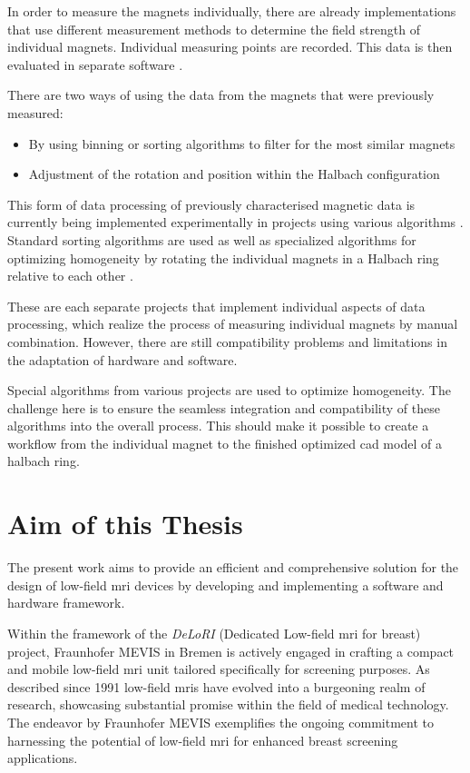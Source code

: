 In order to measure the magnets individually, there are already
implementations that use different measurement methods to determine the
field strength of individual magnets. Individual measuring points are
recorded. This data is then evaluated in separate software
\cite{Wickenbrock_2021}.

There are two ways of using the data from the magnets that were
previously measured:

\begin{itemize}
\tightlist
\item
  By using binning or sorting algorithms to filter for the most similar
  magnets
\item
  Adjustment of the rotation and position within the Halbach
  configuration
\end{itemize}

This form of data processing of previously characterised magnetic data
is currently being implemented experimentally in projects using various
algorithms \cite{Wickenbrock_2021}. Standard sorting algorithms are
used as well as specialized algorithms for optimizing homogeneity by
rotating the individual magnets in a Halbach ring relative to each other
\cite{HalbachMRIDesigner}.

These are each separate projects that implement individual aspects of
data processing, which realize the process of measuring individual
magnets by manual combination. However, there are still compatibility
problems and limitations in the adaptation of hardware and software.

Special algorithms from various projects are used to optimize
homogeneity. The challenge here is to ensure the seamless integration
and compatibility of these algorithms into the overall process. This
should make it possible to create a workflow from the individual magnet
to the finished optimized \gls{cad} model of a halbach ring.

\hypertarget{aim-of-this-thesis}{%
\section{Aim of this Thesis}\label{aim-of-this-thesis}}

The present work aims to provide an efficient and comprehensive solution
for the design of low-field \gls{mri} devices by developing and
implementing a software and hardware framework.

Within the framework of the \emph{DeLoRI} (Dedicated Low-field \gls{mri}
for breast) project, Fraunhofer MEVIS in Bremen is actively engaged in
crafting a compact and mobile low-field \gls{mri} unit tailored
specifically for screening purposes. As described since 1991 low-field
\gls{mri}s have evolved into a burgeoning realm of research, showcasing
substantial promise within the field of medical technology. The endeavor
by Fraunhofer MEVIS exemplifies the ongoing commitment to harnessing the
potential of low-field \gls{mri} for enhanced breast screening
applications.

